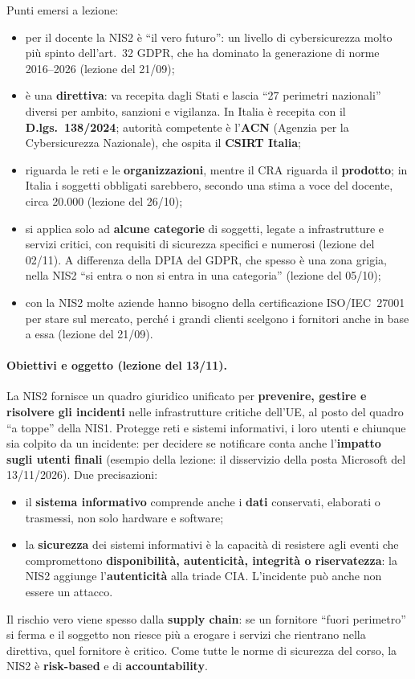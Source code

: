 Punti emersi a lezione:
\begin{itemize}
  \item per il docente la NIS2 è ``il vero futuro'': un livello di cybersicurezza molto più spinto
    dell'art.~32 GDPR, che ha dominato la generazione di norme 2016--2026 (lezione del 21/09);
  \item è una \textbf{direttiva}: va recepita dagli Stati e lascia ``27 perimetri nazionali'' diversi
    per ambito, sanzioni e vigilanza. In Italia è recepita con il \textbf{D.lgs.~138/2024}; autorità
    competente è l'\textbf{ACN} (Agenzia per la Cybersicurezza Nazionale), che ospita il
    \textbf{CSIRT Italia};
  \item riguarda le reti e le \textbf{organizzazioni}, mentre il CRA riguarda il \textbf{prodotto}; in
    Italia i soggetti obbligati sarebbero, secondo una stima a voce del docente, circa 20.000
    (lezione del 26/10);
  \item si applica solo ad \textbf{alcune categorie} di soggetti, legate a infrastrutture e servizi
    critici, con requisiti di sicurezza specifici e numerosi (lezione del 02/11). A differenza della
    DPIA del GDPR, che spesso è una zona grigia, nella NIS2 ``si entra o non si entra in una
    categoria'' (lezione del 05/10);
  \item con la NIS2 molte aziende hanno bisogno della certificazione ISO/IEC~27001 per stare sul
    mercato, perché i grandi clienti scelgono i fornitori anche in base a essa (lezione del 21/09).
\end{itemize}

\paragraph{Obiettivi e oggetto (lezione del 13/11).} La NIS2 fornisce un quadro giuridico unificato per
\textbf{prevenire, gestire e risolvere gli incidenti} nelle infrastrutture critiche dell'UE, al posto
del quadro ``a toppe'' della NIS1. Protegge reti e sistemi informativi, i loro utenti e chiunque sia
colpito da un incidente: per decidere se notificare conta anche l'\textbf{impatto sugli utenti finali}
(esempio della lezione: il disservizio della posta Microsoft del 13/11/2026). Due precisazioni:
\begin{itemize}
  \item il \textbf{sistema informativo} comprende anche i \textbf{dati} conservati, elaborati o
    trasmessi, non solo hardware e software;
  \item la \textbf{sicurezza} dei sistemi informativi è la capacità di resistere agli eventi che
    compromettono \textbf{disponibilità, autenticità, integrità o riservatezza}: la NIS2 aggiunge
    l'\textbf{autenticità} alla triade CIA. L'incidente può anche non essere un attacco.
\end{itemize}
Il rischio vero viene spesso dalla \textbf{supply chain}: se un fornitore ``fuori perimetro'' si ferma e
il soggetto non riesce più a erogare i servizi che rientrano nella direttiva, quel fornitore è critico.
Come tutte le norme di sicurezza del corso, la NIS2 è \textbf{risk-based} e di \textbf{accountability}.

